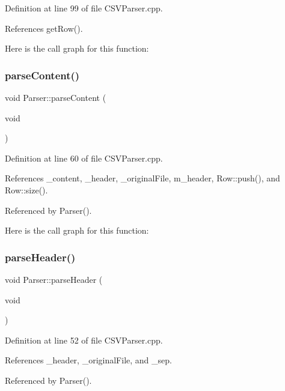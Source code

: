 Definition at line 99 of file C\+S\+V\+Parser.\+cpp.



References get\+Row().

Here is the call graph for this function\+:
\mbox{\label{class_parser_a7fe27b82f7adf8633d633ee79e608012}} 
\subsubsection{parse\+Content()}
{\footnotesize\ttfamily void Parser\+::parse\+Content (\begin{DoxyParamCaption}\item[{void}]{ }\end{DoxyParamCaption})\hspace{0.3cm}{\ttfamily [protected]}}



Definition at line 60 of file C\+S\+V\+Parser.\+cpp.



References \+\_\+content, \+\_\+header, \+\_\+original\+File, m\+\_\+header, Row\+::push(), and Row\+::size().



Referenced by Parser().

Here is the call graph for this function\+:
\mbox{\label{class_parser_adf0f8593adc24b7c2c9318473afcf8e4}} 
\subsubsection{parse\+Header()}
{\footnotesize\ttfamily void Parser\+::parse\+Header (\begin{DoxyParamCaption}\item[{void}]{ }\end{DoxyParamCaption})\hspace{0.3cm}{\ttfamily [protected]}}



Definition at line 52 of file C\+S\+V\+Parser.\+cpp.



References \+\_\+header, \+\_\+original\+File, and \+\_\+sep.



Referenced by Parser().

\mbox{\label{class_parser_a3cf277ff6ffc29b4be24adc8af113cc9}} 
